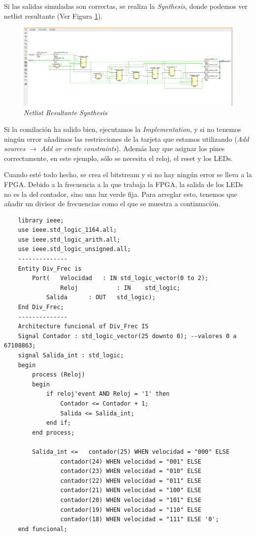 Si las salidas simuladas son correctas, se realiza la \textit{Synthesis}, donde podemos ver netlist resultante (Ver Figura \ref{netlist}).

\begin{figure}[H]
    \centering
    \includegraphics[width = 1\textwidth]{imagenes/netlist1.png}
    \caption{\textit{Netlist Resultante Synthesis}}\label{netlist}
\end{figure}

Si la comilación ha salido bien, ejecutamos la \textit{Implementation}, y si no tenemos ningún error añadimos las restricciones de la tarjeta 
que estamos utilizando (\textit{Add sources} $\rightarrow$ \textit{Add or create constraints}). Además hay que asignar los pines correctamente, en 
este ejemplo, sólo se necesita el reloj, el reset y los LEDs.

Cuando esté todo hecho, se crea el bitstream y si no hay ningún error se lleva a la FPGA. Debido a la frecuencia a la que trabaja la FPGA, la salida 
de los LEDs no es la del contador, sino una luz verde fija. Para arreglar esto, tenemos que añadir un divisor de frecuencias como el que se muestra 
a continuación.

\begin{lstlisting}
    library ieee;
    use ieee.std_logic_1164.all;
    use ieee.std_logic_arith.all;
    use ieee.std_logic_unsigned.all;
    --------------
    Entity Div_Frec is
        Port(	Velocidad 	: IN std_logic_vector(0 to 2);
                Reloj			: IN	std_logic;
            Salida		: OUT	std_logic);
    End Div_Frec;
    --------------
    Architecture funcional of Div_Frec IS
    Signal Contador : std_logic_vector(25 downto 0); --valores 0 a 67108863;
    signal Salida_int : std_logic;
    begin
        process (Reloj)
        begin
            if reloj'event AND Reloj = '1' then		
                Contador <= Contador + 1;
                Salida <= Salida_int;
            end if;
        end process;

        Salida_int <= 	contador(25) WHEN velocidad = "000" ELSE
                contador(24) WHEN velocidad = "001" ELSE
                contador(23) WHEN velocidad = "010" ELSE
                contador(22) WHEN velocidad = "011" ELSE
                contador(21) WHEN velocidad = "100" ELSE
                contador(20) WHEN velocidad = "101" ELSE
                contador(19) WHEN velocidad = "110" ELSE
                contador(18) WHEN velocidad = "111" ELSE '0';
    end funcional;
\end{lstlisting}

